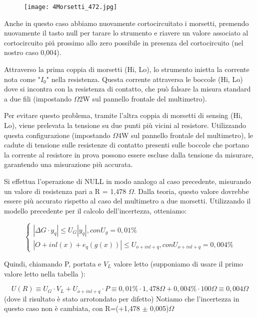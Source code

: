 \begin{figure}
    \centering
    \texttt{[image: 4Morsetti\_472.jpg]}
    \label{fig:4morsetti}
\end{figure}
Anche in questo caso abbiamo nuovamente cortocircuitato i morsetti, premendo nuovamente il tasto null per tarare lo strumento e riavere un valore associato al cortocircuito pi\'u prossimo allo zero possibile in presenza del cortocircuito (nel nostro caso 0,004).


Attraverso la prima coppia di morsetti (Hi, Lo), lo strumento inietta la corrente nota come "$I_0$" nella resistenza. Questa corrente attraversa le boccole (Hi, Lo) dove si incontra con la resistenza di contatto, che può falsare la misura standard a due fili (impostando $\Omega$2W sul pannello frontale del multimetro).

Per evitare questo problema, tramite l'altra coppia di morsetti di sensing (Hi, Lo), viene prelevata la tensione su due punti più vicini al resistore. Utilizzando questa configurazione (impostando $\Omega$4W sul pannello frontale del multimetro), le cadute di tensione sulle resistenze di contatto presenti sulle boccole che portano la corrente al resistore in prova possono essere escluse dalla tensione da misurare, garantendo una misurazione più accurata.

Si effettua l'operazione di NULL in modo analogo al caso precedente, misurando un valore di resistenza pari a R = 1,478 $\Omega$. Dalla teoria, questo valore dovrebbe essere più accurato rispetto al caso del multimetro a due morsetti. Utilizzando il modello precedente per il calcolo dell'incertezza, otteniamo:

\begin{equation}
    \left\{\begin{array}{l}
| \Delta G \cdot y_q | \leq U_G |y_q|,    con U_g=0,01\%
\\ | O + inl(x) + e_q(g(x)) | \leq U_{o+inl+q}, con U_{o+inl+q}=0,004\%
\end{array}\right.
\end{equation}


    


Quindi, chiamando P, portata e $V_L$ valore letto (supponiamo di usare il primo valore letto nella tabella \label{mult_port}):

\begin{equation*}
    U(R) \equiv U_G \cdot V_L + U_{o+inl+q} \cdot P \equiv 0,01\% \cdot 1,478\Omega + 0,004 \% \cdot 100 \Omega \equiv 0,004 \Omega 
\end{equation*}
(dove il risultato è stato arrotondato per difetto)
Notiamo che l’incertezza in questo caso non è cambiata, con R=(+1,478 $\pm$ 0,005)$\Omega$



